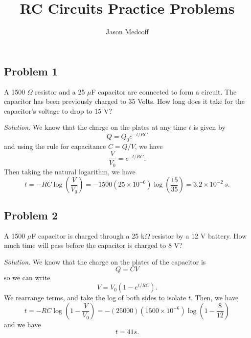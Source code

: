 \documentclass{article}
\title{RC Circuits Practice Problems}
\author{Jason Medcoff}
\date{}
\begin{document}
	\maketitle
	
	\subsection{Problem 1}
	A 1500 $\Omega$ resistor and a 25 $\mu$F capacitor are connected to form a circuit. The capacitor has been previously charged to 35 Volts. How long does it take for the capacitor's voltage to drop to 15 V?
	
	\textit{Solution.}
	We know that the charge on the plates at any time $t$ is given by
	$$ Q = Q_0 e^{-t/RC} $$
	and using the rule for capacitance $ C = Q/V$, we have
	$$ \frac{V}{V_0} = e^{-t/RC} . $$
	Then taking the natural logarithm, we have
	$$ t = -RC \log(\frac{V}{V_0}) = -1500(25 \times 10^{-6}) \log(\frac{15}{35}) = 3.2 \times 10^{-2} \ s . $$
	
	
	\subsection{Problem 2}
	A 1500 $\mu$F capacitor is charged through a 25 k$\Omega$ resistor by a 12 V battery. How much time will pass before the capacitor is charged to 8 V?
	
	\textit{Solution.} We know that the charge on the plates of the capacitor is
	$$ Q = CV $$
	so we can write
	$$ V = V_0 (1 - e^{t/RC}) . $$
	We rearrange terms, and take the log of both sides to isolate $t$. Then, we have
	$$ t = -RC \log(1-\frac{V}{V_0}) = -(25000)(1500 \times 10^{-6}) \log(1 - \frac{8}{12}) $$
	and we have
	$$ t = 41 s . $$
	
	
	
	
	
	
	
	
	
	
	
	
	
	
	
	
	
	
\end{document}
